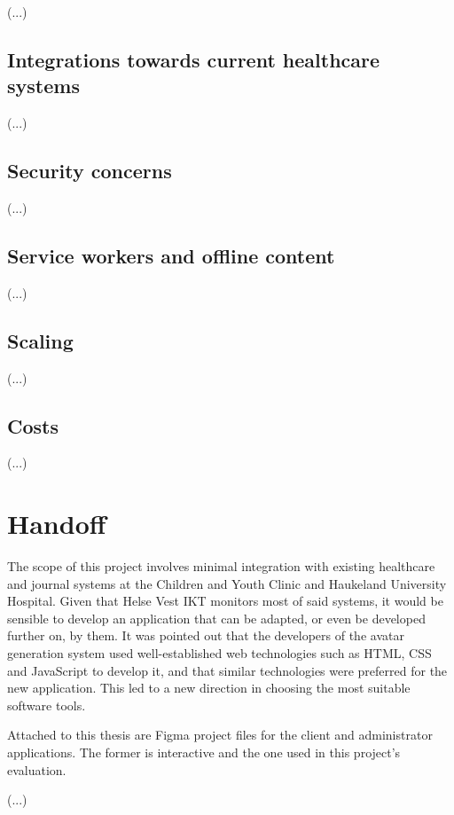 (...)

\subsection{Integrations towards current healthcare systems}

(...)

\subsection{Security concerns}

(...)

\subsection{Service workers and offline content}

(...)


\subsection{Scaling}

(...)

\subsection{Costs}

(...)

\section{Handoff}

The scope of this project involves minimal integration with existing healthcare and journal systems at the Children and Youth Clinic and Haukeland University Hospital. Given that Helse Vest IKT monitors most of said systems, it would be sensible to develop an application that can be adapted, or even be developed further on, by them. It was pointed out that the developers of the avatar generation system used well-established web technologies such as HTML, CSS and JavaScript to develop it, and that similar technologies were preferred for the new application. This led to a new direction in choosing the most suitable software tools.

Attached to this thesis are Figma project files for the client and administrator applications. The former is interactive and the one used in this project's evaluation. %

(...)
